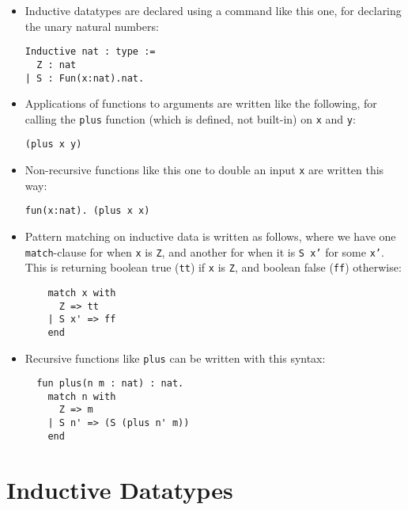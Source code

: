\documentclass{book}[12pt]
\begin{document}
\begin{itemize}

\item Inductive datatypes are declared using a command like this
one, for declaring the unary natural numbers:

\begin{verbatim}
Inductive nat : type :=
  Z : nat
| S : Fun(x:nat).nat.
\end{verbatim}

\item Applications of functions to arguments are written like the
following, for calling the \texttt{plus} function (which is defined,
not built-in) on \texttt{x} and \texttt{y}:

\begin{verbatim}
(plus x y)
\end{verbatim}

\item Non-recursive functions like this one to double an input
\texttt{x} are written this way:

\begin{verbatim}
fun(x:nat). (plus x x)
\end{verbatim}

\item Pattern matching on inductive data is written as follows, where
we have one \texttt{match}-clause for when \texttt{x} is \texttt{Z},
and another for when it is \texttt{S x'} for some \texttt{x'}.  This
is returning boolean true (\texttt{tt}) if \texttt{x} is \texttt{Z},
and boolean false (\texttt{ff}) otherwise:

\begin{verbatim}
    match x with 
      Z => tt 
    | S x' => ff
    end
\end{verbatim}

\item Recursive functions like \texttt{plus} can be written with this
syntax:

\begin{verbatim}
  fun plus(n m : nat) : nat.
    match n with
      Z => m
    | S n' => (S (plus n' m))
    end
\end{verbatim}

\end{itemize}


\section{Inductive Datatypes}
\end{document}
